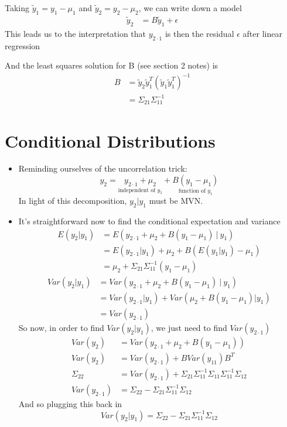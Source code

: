 \documentclass[12pt]{article}
\begin{document}
\begin{itemize}
	Taking $\tilde{y}_1 = y_1 - \mu_1$ and $\tilde{y}_2 = y_2 - \mu_2$, we can write down a model
	\begin{align*}
	\tilde{y}_2 &= B\tilde{y}_1 + \epsilon
	\end{align*}
	This leads us to the interpretation that $y_{2 \cdot 1}$ is then the residual $\epsilon$ after linear regression
	
	And the least squares solution for B (see section 2 notes) is
	\begin{align*}
	B &= \tilde{y}_2 \tilde{y}_1^T (\tilde{y}_1 \tilde{y}_1^T)^{-1} \\
	  &= \Sigma_{21} \Sigma_{11}^{-1}
	\end{align*}
\end{itemize}

\section{Conditional Distributions}
\begin{itemize}
	\item Reminding ourselves of the uncorrelation trick:
	$$y_2 =  \underset{\text{independent of }y_1}{y_{2 \cdot 1} + \mu_2} + \underset{\text{function of }y_1}{B(y_1 - \mu_1)}$$
	In light of this decomposition, $y_2 | y_1$ must be MVN.
	\item It's straightforward now to find the conditional expectation and variance
	\begin{align*}
		E(y_2 | y_1) &= E(y_{2 \cdot 1} + \mu_2 + B(y_1 - \mu_1) \ | \ y_1) \\
					&= E(y_{2 \cdot 1} | y_1) + \mu_2 + B(E(y_1 | y_1) - \mu_1) \\
					&= \mu_2 + \Sigma_{21} \Sigma_{11}^{-1} (y_1 - \mu_1)
	\end{align*}
	\begin{align*}
	Var(y_2 | y_1) &= Var(y_{2 \cdot 1} + \mu_2 + B(y_1 - \mu_1) \ |\  y_1) \\
	&= Var(y_{2 \cdot 1} | y_1) + Var(\mu_2 + B(y_1 - \mu_1) | y_1) \\
	&= Var(y_{2 \cdot 1})
	\end{align*}
	So now, in order to find $Var(y_2 | y_1)$, we just need to find $Var(y_{2\cdot1})$
	\begin{align*}
		Var(y_2) &= Var(y_{2 \cdot 1} + \mu_2 + B(y_1 - \mu_1)) \\
		Var(y_2) &= Var(y_{2 \cdot 1}) + BVar(y_11)B^T \\
		\Sigma_{22} &= Var(y_{2 \cdot 1}) + \Sigma_{21} \Sigma_{11}^{-1} \Sigma_{11} \Sigma_{11}^{-1} \Sigma_{12} \\
		Var(y_{2 \cdot 1}) &= \Sigma_{22} - \Sigma_{21} \Sigma_{11}^{-1} \Sigma_{12}
	\end{align*}
	And so plugging this back in
	$$Var(y_2 | y_1) = \Sigma_{22} - \Sigma_{21} \Sigma_{11}^{-1} \Sigma_{12}$$
\end{itemize}
\end{document}

